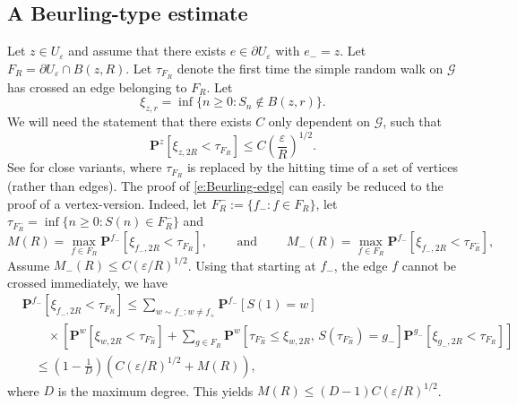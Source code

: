 \documentclass[11pt]{article}
\theoremstyle{remark}
\def\eps{\varepsilon}
\def\Pr{\mathbf{P}}
\def\cG{\mathcal{G}}
\begin{document}
\subsection{A Beurling-type estimate}
\label{ssec:Beurling}

Let $z \in U_\eps$ and assume that there exists $e \in \partial U_\eps$ with $e_- = z$.
Let $F_R = \partial U_\eps \cap B(z,R)$. Let $\tau_{F_R}$ denote the first time the 
simple random walk on $\cG$ has crossed an edge belonging to $F_R$. Let 
\[ \xi_{z,r}
   = \inf \{ n \ge 0 : S_n \not\in B(z,r) \}. \]
We will need the statement that there exists $C$ only dependent on $\cG$, such that 
\begin{equation}
\label{e:Beurling-edge}
   \Pr^z [ \xi_{z,2R} < \tau_{F_R} ]
   \le C \left( \frac{\eps}{R} \right)^{1/2}. 
\end{equation} 
See \cite{Kesten-Beurling,Lawler-book-intersections,LL04} for close variants, where 
$\tau_{F_R}$ is replaced by the hitting time of a set of vertices (rather than edges).
The proof of \eqref{e:Beurling-edge} can easily be reduced to the proof of a vertex-version. Indeed, let $F_R^- := \{ f_- : f \in F_R \}$, let 
$\tau_{F_R^-} = \inf \{ n \ge 0 : S(n) \in F_R^- \}$ and 
\[ M(R) 
   = \max_{f \in F_R} \Pr^{f_-} [ \xi_{f_-,2R} < \tau_{F_R} ], \qquad
\text{ and } \qquad
   M_-(R) 
   = \max_{f \in F_R} \Pr^{f_-} [ \xi_{f_-,2R} < \tau_{F_R^-} ], \]
Assume $M_-(R) \le C (\eps/R)^{1/2}$. Using that starting at $f_-$, the edge $f$ 
cannot be crossed immediately, we have
\begin{equation*}
\begin{split}
    &\Pr^{f_-} [ \xi_{f_-,2R} < \tau_{F_R} ] 
    \le \sum_{w \sim f_- : w \not= f_+} 
        \Pr^{f_-} [ S(1) = w ] \\
    &\quad\quad \times \left[ \Pr^w [ \xi_{w,2R} < \tau_{F_R^-} ] + 
        \sum_{g \in F_R} \Pr^w [ \tau_{F_R^-} \le \xi_{w,2R},\, S(\tau_{F_R^-}) = g_- ]
        \Pr^{g_-} [ \xi_{g_-,2R} < \tau_{F_R} ] \right] \\
    &\quad \le \left( 1 - \frac{1}{D} \right) \left( C (\eps/R)^{1/2} + M(R) \right), 
\end{split}
\end{equation*}
where $D$ is the maximum degree. This yields $M(R) \le (D-1) C (\eps/R)^{1/2}$.
\end{document}
